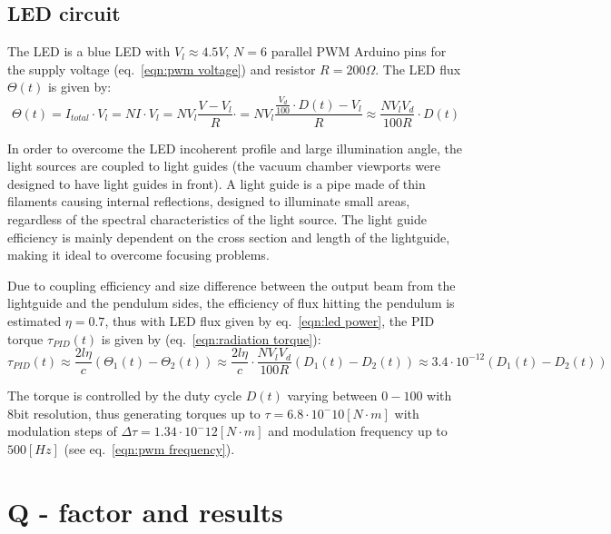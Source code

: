\documentclass[\main/master.tex]{subfiles}
\begin{document}
\subsection{LED circuit}
The LED is a blue LED with $V_l\approx 4.5V$, $N=6$ parallel PWM Arduino pins for the supply voltage (eq.~\ref{eqn:pwm voltage}) and resistor $R = 200\Omega$. The LED flux $\Theta(t)$ is given by:
\begin{equation}
\Theta(t) = I_{total}\cdot V_l = NI\cdot V_l = N V_l \frac{V-V_l}{R}\cdot  =N V_l\frac{\frac{V_d}{100}\cdot D(t)-V_l}{R} \approx \frac{N V_lV_d}{100R}\cdot D(t) \label{eqn:led power}
\end{equation}
\par\noindent
In order to overcome the LED incoherent profile and large illumination angle, the light sources are coupled to light guides (the vacuum chamber viewports were designed to have light guides in front). A light guide is a pipe made of thin filaments causing internal reflections, designed to illuminate small areas, regardless of the spectral characteristics of the light source. The light guide efficiency is mainly dependent on the cross section and length of the lightguide, making it ideal to overcome focusing problems. 
\par\noindent
Due to coupling efficiency and size difference between the output beam from the lightguide and the pendulum sides, the efficiency of flux hitting the pendulum is estimated $\eta = 0.7$, thus with LED flux given by eq.~\ref{eqn:led power}, the PID torque $\tau_{PID}(t)$ is given by (eq.~\ref{eqn:radiation torque}):
\begin{equation}
\tau_{PID}(t) \approx \frac{2l\eta}{{c}} (\Theta_1(t) -\Theta_2(t)) \approx \frac{2l\eta}{{c}} \cdot\frac{N V_l V_d}{100R}(D_1(t) -D_2(t))  \approx   3.4\cdot 10^{-12}(D_1(t) -D_2(t)) 
\label{eqn:led torque}
\end{equation}
\par\noindent
The torque is controlled by the duty cycle $D(t)$ varying between $0-100$ with 8bit resolution, thus generating torques up to $\tau = 6.8\cdot10^-{10} [N\cdot m]$ with modulation steps of $\Delta\tau = 1.34\cdot10^-{12} [N\cdot m]$ and modulation frequency up to $500[Hz]$ (see eq.~\ref{eqn:pwm frequency}).
\section{Q - factor and results}
\end{document}
